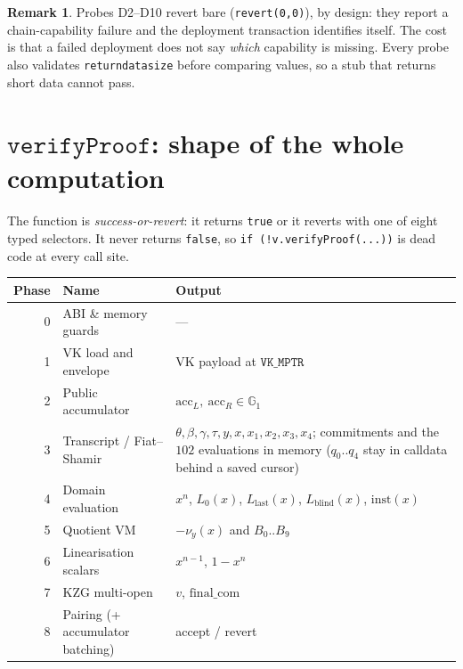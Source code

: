 \documentclass[11pt,a4paper]{article}
\newcommand{\Gone}{\ensuremath{\mathbb{G}_{1}}}
\newcommand{\code}[1]{\texttt{#1}}
\newcommand{\mptr}[1]{\texttt{#1}}
\theoremstyle{definition}
\newtheorem{remark}{Remark}[section]
\begin{document}
\begin{remark}
Probes D2--D10 revert bare (\code{revert(0,0)}), by design: they report a
chain-capability failure and the deployment transaction identifies itself. The
cost is that a failed deployment does not say \emph{which} capability is
missing. Every probe also validates \code{returndatasize} before comparing
values, so a stub that returns short data cannot pass.
\end{remark}

\section{\texorpdfstring{$\code{verifyProof}$}{verifyProof}: shape of the whole computation}
\label{sec:overview}

The function is \emph{success-or-revert}: it returns \code{true} or it reverts
with one of eight typed selectors. It never returns \code{false}, so
\code{if (!v.verifyProof(...))} is dead code at every call site.

\begin{center}
\begin{tabular}{@{}rlp{8.4cm}@{}}
\toprule
Phase & Name & Output \\
\midrule
0 & ABI \& memory guards       & --- \\
1 & VK load and envelope       & VK payload at $\mptr{VK\_MPTR}$ \\
2 & Public accumulator         & $\mathrm{acc}_L,\ \mathrm{acc}_R \in \Gone$ \\
3 & Transcript / Fiat--Shamir  & $\theta,\beta,\gamma,\tau,y,x,x_1,x_2,x_3,x_4$; commitments and the $102$ evaluations in memory ($q_0..q_4$ stay in calldata behind a saved cursor) \\
4 & Domain evaluation          & $x^{n}$, $L_0(x)$, $L_{\mathrm{last}}(x)$, $L_{\mathrm{blind}}(x)$, $\mathrm{inst}(x)$ \\
5 & Quotient VM                & $-\nu_y(x)$ and $B_0..B_9$ \\
6 & Linearisation scalars      & $x^{n-1}$, $1-x^{n}$ \\
7 & KZG multi-open             & $v$, $\mathrm{final\_com}$ \\
8 & Pairing (+ accumulator batching) & accept / revert \\
\bottomrule
\end{tabular}
\end{center}
\end{document}
